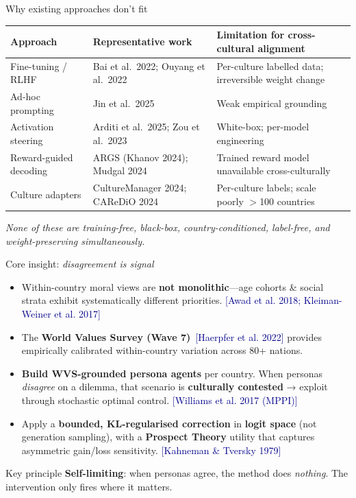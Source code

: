 \documentclass[10pt,aspectratio=169]{beamer}
\newcommand{\cit}[1]{{\scriptsize\textcolor{darkblue}{[#1]}}}
\begin{document}
\begin{frame}{Why existing approaches don't fit}
  \small
  \begin{tabular}{p{3.4cm} p{4.0cm} p{5.5cm}}
    \toprule
    \textbf{Approach} & \textbf{Representative work} & \textbf{Limitation for cross-cultural alignment} \\
    \midrule
    Fine-tuning / RLHF
      & Bai et al.\ 2022; Ouyang et al.\ 2022
      & Per-culture labelled data; irreversible weight change \\
    Ad-hoc prompting
      & Jin et al.\ 2025
      & Weak empirical grounding \\
    Activation steering
      & Arditi et al.\ 2025; Zou et al.\ 2023
      & White-box; per-model engineering \\
    Reward-guided decoding
      & ARGS (Khanov 2024); Mudgal 2024
      & Trained reward model unavailable cross-culturally \\
    Culture adapters
      & CultureManager 2024; CAReDiO 2024
      & Per-culture labels; scale poorly $>$100 countries \\
    \bottomrule
  \end{tabular}
  \vspace{0.4em}

  \footnotesize\emph{None of these are training-free, black-box, country-conditioned, label-free, and weight-preserving simultaneously.}
\end{frame}

\begin{frame}{Core insight: \emph{disagreement is signal}}
  \begin{itemize}
    \item Within-country moral views are \textbf{not monolithic}---age cohorts \& social strata exhibit systematically different priorities. \cit{Awad et al. 2018; Kleiman-Weiner et al. 2017}
    \item The \textbf{World Values Survey (Wave 7)}~\cit{Haerpfer et al. 2022} provides empirically calibrated within-country variation across 80+ nations.
    \item \textbf{Build WVS-grounded persona agents} per country. When personas \emph{disagree} on a dilemma, that scenario is \textbf{culturally contested} → exploit through stochastic optimal control. \cit{Williams et al. 2017 (MPPI)}
    \item Apply a \textbf{bounded, KL-regularised correction} in \textbf{logit space} (not generation sampling), with a \textbf{Prospect Theory} utility that captures asymmetric gain/loss sensitivity. \cit{Kahneman \& Tversky 1979}
  \end{itemize}
  \begin{alertblock}{Key principle}
    \textbf{Self-limiting}: when personas agree, the method does \emph{nothing}. The intervention only fires where it matters.
  \end{alertblock}
\end{frame}
\end{document}
